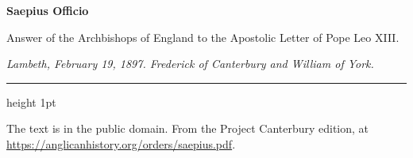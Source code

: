 \documentclass[11pt,letterpaper]{article}
\begin{document}
\color{ink}
\begin{center}
{\LARGE\bfseries\color{heading} Saepius Officio\par}
\vspace{1em}
{\large Answer of the Archbishops of England to the Apostolic Letter of Pope Leo XIII.\par}
\vspace{0.6em}
{\itshape\color{subhead} Lambeth, February 19, 1897. Frederick of Canterbury and William of York.\par}
\vspace{0.4em}
{\color{accent}\hrule height 1pt}
\end{center}
\vspace{1em}



\vspace{2em}
{\small\noindent The text is in the public domain. From the Project Canterbury edition,
at \url{https://anglicanhistory.org/orders/saepius.pdf}.\par}
\end{document}
